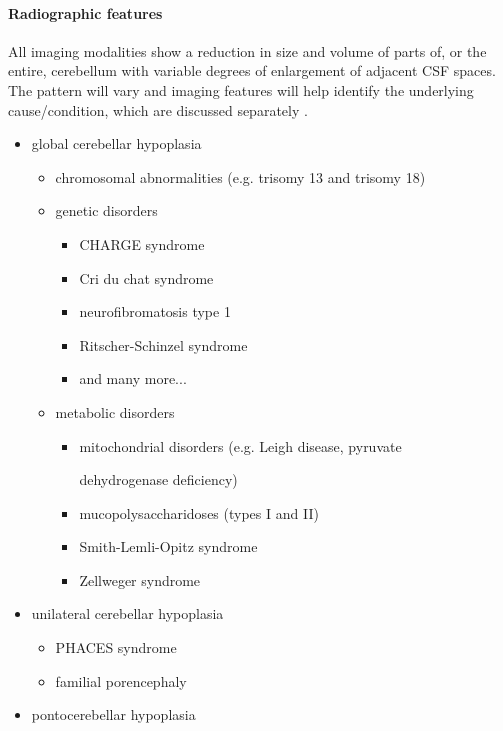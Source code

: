 \paragraph{Radiographic features}

All imaging modalities show a reduction in size and volume of parts of, or the entire, cerebellum with variable degrees of enlargement of adjacent CSF spaces. The pattern will vary and imaging features will help identify the underlying cause/condition, which are discussed separately .

\begin{itemize}
	\item
	global cerebellar hypoplasia
	
	\begin{itemize}
		\item
		chromosomal abnormalities (e.g. trisomy 13 and trisomy 18)
		\item
		genetic disorders
		
		\begin{itemize}
			\item
			CHARGE syndrome
			\item
			Cri du chat syndrome
			\item
			neurofibromatosis type 1
			\item
			Ritscher-Schinzel syndrome
			\item
			and many more... 
		\end{itemize}
		\item
		metabolic disorders
		
		\begin{itemize}
			\item
			mitochondrial disorders (e.g. Leigh disease, pyruvate
			
			dehydrogenase deficiency)
			\item
			mucopolysaccharidoses (types I and II)
			\item
			Smith-Lemli-Opitz syndrome
			\item
			Zellweger syndrome
		\end{itemize}
	\end{itemize}
	\item
	unilateral cerebellar hypoplasia
	
	\begin{itemize}
		\item
		PHACES syndrome
		\item
		familial porencephaly
	\end{itemize}
	\item
	pontocerebellar hypoplasia
	

\end{itemize}
